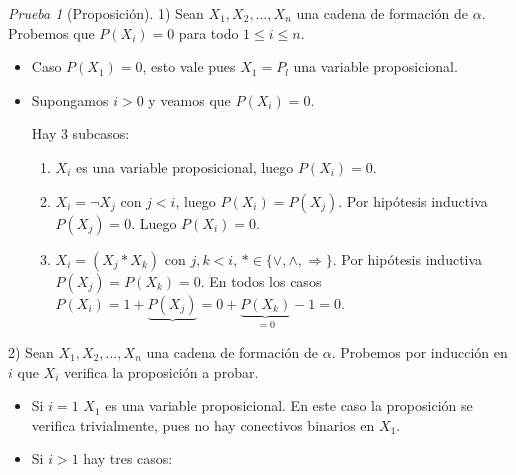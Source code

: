 \documentclass[a4paper,11pt]{article}
\theoremstyle{definition}
\theoremstyle{remark}
\newtheorem*{prue}{Prueba}
\begin{document}
\begin{prue}[Proposición]

1) Sean $X_1, X_2, \dots, X_n$ una cadena de formación de $\alpha$. Probemos que
$P(X_i) = 0$ para todo $1 \le i \le n$.

\begin{itemize}
\item Caso $P(X_1) = 0$, esto vale pues $X_1 = P_l$ una variable proposicional.
\item Supongamos $i > 0$ y veamos que $P(X_i) = 0$.

Hay 3 subcasos:
\begin{enumerate}[label=\alph*)]
\item $X_i$ es una variable proposicional, luego $P(X_i) = 0$.
\item $X_i = \neg X_j$ con $j < i$, luego $P(X_i) = P(X_j)$. Por hipótesis inductiva
$P(X_j) = 0$. Luego $P(X_i) = 0$.
\item $X_i = (X_j * X_k)$ con $j, k < i$, $* \in \{\vee, \wedge, \Rightarrow\}$.
Por hipótesis inductiva $P(X_j) = P(X_k) = 0$. En todos los casos 
$P(X_i) = 1 + \underbrace{P(X_j)}{=0} + \underbrace{P(X_k)}_{=0} - 1 = 0$.
\end{enumerate}
\end{itemize}

2) Sean $X_1, X_2, \dots, X_n$ una cadena de formación de $\alpha$. Probemos por
inducción en $i$ que $X_i$ verifica la proposición a probar.

\begin{itemize}
\item Si $i = 1$ $X_1$ es una variable proposicional. En este caso la proposición
se verifica trivialmente, pues no hay conectivos binarios en $X_1$.
\item Si $i > 1$ hay tres casos:


\end{itemize}
\end{prue}
\end{document}

